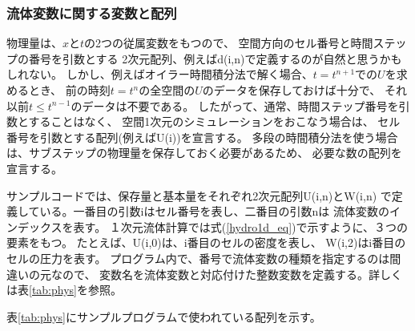 \subsubsection{流体変数に関する変数と配列}
物理量は、$x$と$t$の2つの従属変数をもつので、
空間方向のセル番号と時間ステップの番号を引数とする
2次元配列、例えば{\ttfamily d(i,n)}で定義するのが自然と思うかもしれない。
しかし、例えばオイラー時間積分法で解く場合、$t=t^{n+1}$での$U$を求めるとき、
前の時刻$t=t^n$の全空間の$U$のデータを保存しておけば十分で、
それ以前$t\le t^{n-1}$のデータは不要である。
したがって、通常、時間ステップ番号を引数とすることはなく、
空間1次元のシミュレーションをおこなう場合は、
セル番号を引数とする配列(例えば{\ttfamily U(i)})を宣言する。
多段の時間積分法を使う場合は、サブステップの物理量を保存しておく必要があるため、
必要な数の配列を宣言する。

\vspace{1cm}

サンプルコードでは、保存量と基本量をそれぞれ2次元配列{\ttfamily U(i,n)}と{\ttfamily W(i,n)}
で定義している。一番目の引数{\ttfamily i}はセル番号を表し、二番目の引数{\ttfamily n}は
流体変数のインデックスを表す。
１次元流体計算では式(\ref{hydro1d_eq})で示すように、３つの要素をもつ。
たとえば、{\ttfamily U(i,0)}は、i番目のセルの密度を表し、
{\ttfamily W(i,2)}はi番目のセルの圧力を表す。
プログラム内で、番号で流体変数の種類を指定するのは間違いの元なので、
変数名を流体変数と対応付けた整数変数を定義する。詳しくは表\ref{tab:phys}を参照。




表\ref{tab:phys}にサンプルプログラムで使われている配列を示す。




